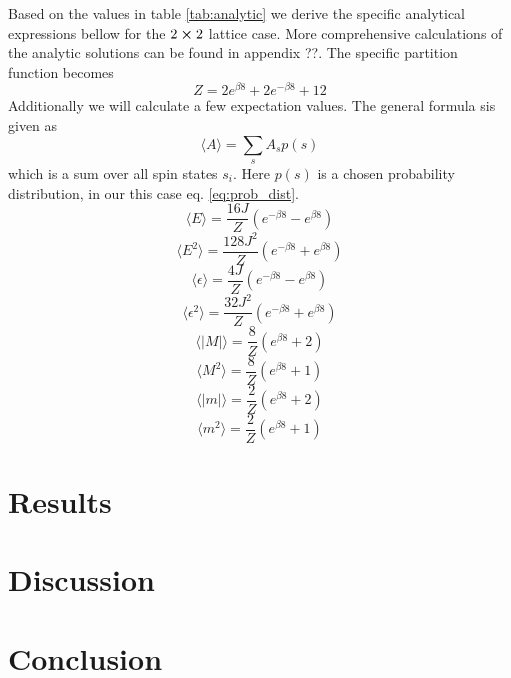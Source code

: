 \documentclass[english,notitlepage,reprint,nofootinbib]{revtex4-1}  %
\begin{document}
Based on the values in table \ref{tab:analytic} we derive the specific analytical expressions bellow for the $2 \cross 2$ lattice case. More comprehensive calculations of the analytic solutions can be found in appendix ??. The specific partition function becomes
\begin{equation}
    Z = 2 e^{\beta 8} + 2 e^{- \beta 8} + 12
\end{equation}
Additionally we will calculate a few expectation values. The general formula sis given as
\begin{equation}
    \langle A \rangle = \sum_s A_s p(s)
\end{equation}
which is a sum over all spin states $s_i$. Here $p(s)$ is a chosen probability distribution, in our this case eq. \ref{eq:prob_dist}.
\begin{equation}
    \langle E \rangle = \frac{16J}{Z} \left( e^{-\beta 8} - e^{\beta 8} \right)
\end{equation}
\begin{equation}
    \langle E^2 \rangle = \frac{128 J^2}{Z} \left( e^{-\beta 8} + e^{\beta 8} \right)
\end{equation}
\begin{equation}
    \langle \epsilon \rangle = \frac{4J}{Z} \left( e^{-\beta 8} - e^{\beta 8} \right)
\end{equation}
\begin{equation}
    \langle \epsilon^2 \rangle = \frac{32 J^2}{Z} \left( e^{-\beta 8} + e^{\beta 8} \right)
\end{equation}
\begin{equation}
    \langle |M| \rangle = \frac{8}{Z} \left( e^{\beta 8} + 2 \right)
\end{equation}
\begin{equation}
    \langle M^2 \rangle = \frac{8}{Z} \left( e^{\beta 8} + 1 \right)
\end{equation}
\begin{equation}
    \langle |m| \rangle = \frac{2}{Z} \left( e^{\beta 8} + 2 \right)
\end{equation}
\begin{equation}
    \langle m^2 \rangle = \frac{2}{Z} \left( e^{\beta 8} + 1 \right)
\end{equation}

\section{Results}\label{sec:results}



\section{Discussion}\label{sec:discussion}
%


\section{Conclusion}\label{sec:conclusion}



\onecolumngrid

%

\end{document}
